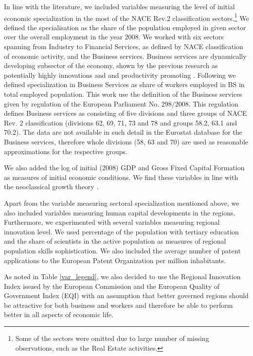 \documentclass[11pt]{article}
\begin{document}
In line with the literature, we included variables measuring the level of initial economic specialization in the most of the NACE Rev.2 classification sectors.\footnote{Some of the sectors were omitted due to large number of missing observations, such as the Real Estate activities.} We defined the specialisation as the share of the population employed in given sector over the overall employment in the year 2008. We worked with six sectors spanning from Industry to Financial Services, as defined by NACE classification of economic activity, and the Business services. Business services are dynamically developing subsector of the economy, shown by the previous research as potentially highly innovations and and productivity promoting \citep{corrocher2014kibs}. Following \citet{guastella2015knowledge} we defined specialization in Business Services as share of workers employed in BS in total employed population. This work use the definition of the Business services given by regulation of the European Parliament No. 298/2008. This regulation defines Business services as consisting of five divisions and three groups of NACE Rev. 2 classification (divisions 62, 69, 71, 73 and 78 and groups 58.2, 63.1 and 70.2). The data are not available in such detail in the Eurostat database for the Business services, therefore whole divisions (58, 63 and 70) are used as reasonable approximations for the respective groups.

We also added the log of initial (2008) GDP and Gross Fixed Capital Formation as measures of initial economic conditions. We find these variables in line with the neoclassical growth theory \cite{iammarino2017regional}.%

Apart from the variable measuring sectoral specialization mentioned above, we also included variables measuring human capital developments in the regions. Furthermore, we experimented with several variables measuring regional innovation level. We used percentage of the population with tertiary education and the share of scientists in the active population as measures of regional population skills sophistication. We also included the average number of patent applications to the European Patent Organization per million inhabitants. 

As noted in Table \ref{var_legend}, we also decided to use the Regional Innovation Index issued by the European Commission and the European Quality of Government Index (EQI) with an assumption that better governed regions should be attractive for both business and workers and therefore be able to perform better in all aspects of economic life.
\end{document}
